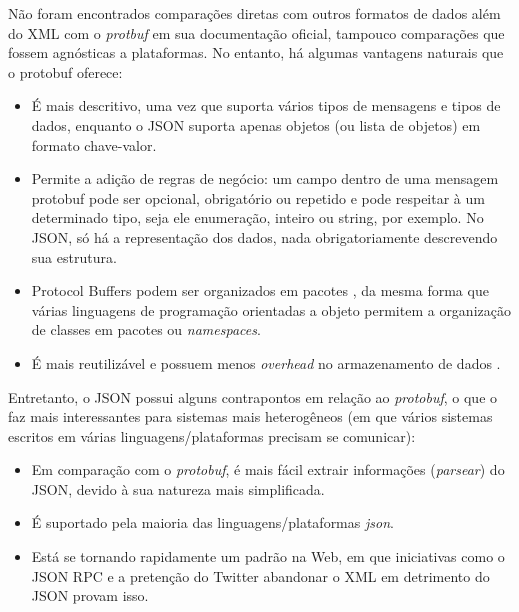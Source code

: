 Não foram encontrados comparações diretas com outros formatos de dados além do XML com o \emph{protbuf} em sua documentação oficial, tampouco comparações que fossem agnósticas a plataformas. No entanto, há algumas vantagens naturais que o protobuf oferece:

\begin{itemize}
	\item É mais descritivo, uma vez que suporta vários tipos de mensagens e tipos de dados, enquanto o JSON suporta apenas objetos (ou lista de objetos) em formato chave-valor.
	\item Permite a adição de regras de negócio: um campo dentro de uma mensagem protobuf pode ser opcional, obrigatório ou repetido e pode respeitar à um determinado tipo, seja ele enumeração, inteiro ou string, por exemplo. No JSON, só há a representação dos dados, nada obrigatoriamente descrevendo sua estrutura.
	\item Protocol Buffers podem ser organizados em pacotes \cite{protobuf_docs}, da mesma forma que várias linguagens de programação orientadas a objeto permitem a organização de classes em pacotes ou \emph{namespaces}.
	\item É mais reutilizável e possuem menos \emph{overhead} no armazenamento de dados \cite{twitter_hadoop}.
\end{itemize}

Entretanto, o JSON possui alguns contrapontos em relação ao \emph{protobuf}, o que o faz mais interessantes para sistemas mais heterogêneos (em que vários sistemas escritos em várias linguagens/plataformas precisam se comunicar):

\begin{itemize}
	\item Em comparação com o \emph{protobuf}, é mais fácil extrair informações (\emph{parsear}) do JSON, devido à sua natureza mais simplificada.
	\item É suportado pela maioria das linguagens/plataformas \emph{json}.
	\item Está se tornando rapidamente um padrão na Web, em que iniciativas como o JSON RPC \cite{json_rpc} e a pretenção do Twitter abandonar o XML em detrimento do JSON \cite{twitter_deprecates_xml} provam isso.
\end{itemize}
